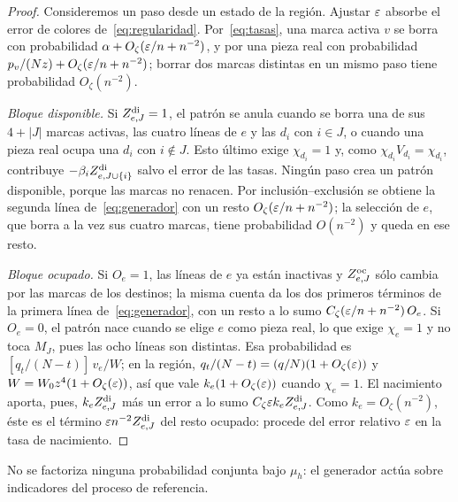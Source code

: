 \begin{proof}
Consideremos un paso desde un estado de la región. Ajustar $\varepsilon$ absorbe el error de colores
de~\eqref{eq:regularidad}. Por~\eqref{eq:tasas}, una marca activa $v$ se borra con probabilidad
$\alpha+O_\zeta(\varepsilon/n+n^{-2})$, y por una pieza real con probabilidad
$p_v/(Nz)+O_\zeta(\varepsilon/n+n^{-2})$; borrar dos marcas distintas en un mismo paso tiene probabilidad
$O_\zeta(n^{-2})$.

\emph{Bloque disponible.} Si $Z^{\mathrm{di}}_{e,J}=1$, el patrón se anula cuando se borra una de sus
$4+|J|$ marcas activas, las cuatro líneas de $e$ y las $d_i$ con $i\in J$, o cuando una pieza real
ocupa una $d_i$ con $i\notin J$. Esto último exige $\chi_{d_i}=1$ y, como
$\chi_{d_i}V_{d_i}=\chi_{d_i}$, contribuye $-\beta_iZ^{\mathrm{di}}_{e,J\cup\{i\}}$ salvo el error de las
tasas. Ningún paso crea un patrón disponible, porque las marcas no renacen. Por
inclusión--exclusión se obtiene la segunda línea de~\eqref{eq:generador} con un resto
$O_\zeta(\varepsilon/n+n^{-2})$; la selección de $e$, que borra a la vez sus cuatro marcas, tiene
probabilidad $O(n^{-2})$ y queda en ese resto.

\emph{Bloque ocupado.} Si $O_e=1$, las líneas de $e$ ya están inactivas y $Z^{\mathrm{oc}}_{e,J}$ sólo
cambia por las marcas de los destinos; la misma cuenta da los dos primeros términos de la primera
línea de~\eqref{eq:generador}, con un resto a lo sumo $C_\zeta(\varepsilon/n+n^{-2})\,O_e$. Si $O_e=0$,
el patrón nace cuando se elige $e$ como pieza real, lo que exige $\chi_e=1$ y no toca $M_J$, pues
las ocho líneas son distintas. Esa probabilidad es $[q_t/(N-t)]\,v_e/W$; en la región,
$q_t/(N-t)=(q/N)(1+O_\zeta(\varepsilon))$ y $W=W_0z^4(1+O_\zeta(\varepsilon))$, así que vale
$k_e(1+O_\zeta(\varepsilon))$ cuando $\chi_e=1$. El nacimiento aporta, pues, $k_eZ^{\mathrm{di}}_{e,J}$ más un
error a lo sumo $C_\zeta\varepsilon k_eZ^{\mathrm{di}}_{e,J}$. Como $k_e=O_\zeta(n^{-2})$, éste es el término
$\varepsilon n^{-2}Z^{\mathrm{di}}_{e,J}$ del resto ocupado: procede del error relativo $\varepsilon$ en la tasa de
nacimiento.
\end{proof}

No se factoriza ninguna probabilidad conjunta bajo $\mu_h$: el generador actúa sobre
indicadores del proceso de referencia.
